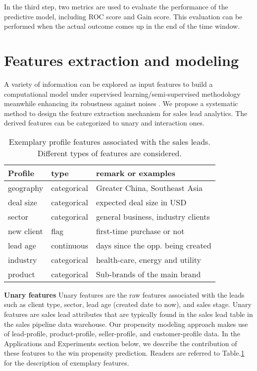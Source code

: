 \documentclass[10pt,conference]{IEEEtran}
\begin{document}
In the third step, two metrics are used to evaluate the performance of the predictive model, including ROC score and Gain score. This evaluation can be performed when the actual outcome comes up in the end of the time window.

\section{Features extraction and modeling}
A variety of information can be explored as input features to build a computational model under supervised learning/semi-supervised methodology \cite{TongICIG11,YanVCIP11,YanEL11,YanICIP10,YanSPL10} meanwhile enhancing its robustness against noises \cite{LiECCV10,LiICIP10}. We propose a systematic method to design the feature extraction mechanism for sales lead analytics. The derived features can be categorized to unary and interaction ones.
\begin{table}[t]
\center
\small
\caption{Exemplary profile features associated with the sales leads. Different types of features are considered.}
\begin{tabular}{|l|l|l|}
    \hline
    Profile&type&remark or examples\\\hline
    geography & categorical & Greater China, Southeast Asia\\\hline
    deal size	&categorical &expected deal size in USD\\\hline
sector&	categorical &general business, industry clients\\\hline
new client&	flag &first-time purchase or not\\\hline
lead age	&continuous &days since the opp. being created\\\hline
industry&	categorical &health-care, energy and utility\\\hline
product&	categorical&Sub-brands of the main brand\\\hline
\end{tabular}\label{tab:features}
\end{table}

\textbf{Unary features} Unary features are the raw features associated with the leads such as client type, sector, lead age (created date to now), and sales stage. Unary features are sales lead attributes that are typically found in the sales lead table in the sales pipeline data warehouse.  Our propensity modeling approach makes use of lead-profile, product-profile, seller-profile, and customer-profile data. In the Applications and Experiments section below, we describe the contribution of these features to the win propensity prediction. Readers are referred to Table.\ref{tab:features} for the description of exemplary features.
\end{document}
